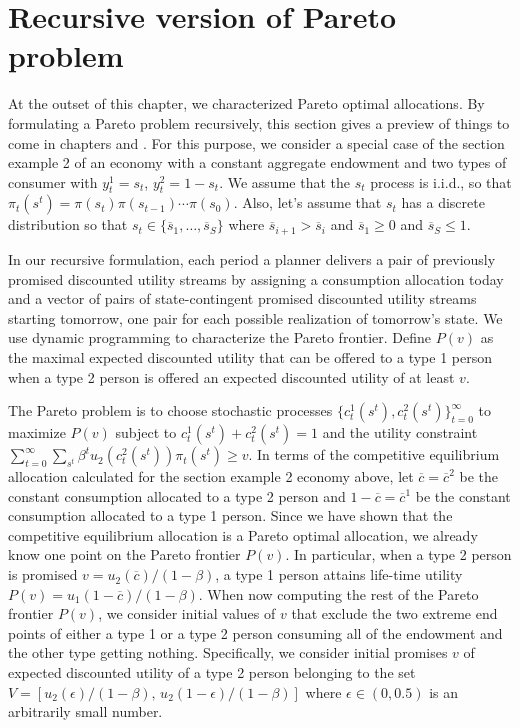 \section{Recursive version of Pareto problem}\label{sec:RecursivePareto}%
At the  outset of this chapter, we characterized Pareto
optimal allocations. By formulating a Pareto problem  recursively, this section
gives a preview of things to come in chapters 
and .
For this purpose, we
consider a special case of the section  example 2 of an
economy with a constant aggregate
endowment and two types of consumer with $y_t^1 = s_t$, $y_t^2 = 1-s_t$.
We  assume that the $s_t$ process
is i.i.d., so that $\pi_t(s^t) = \pi(s_t)
\pi(s_{t-1}) \cdots \pi(s_0)$.   Also, let's assume
that $s_t$ has a discrete distribution
so that
$s_t \in \{\overline s_1, \ldots, \overline s_S\} $
where $\overline s_{i+1} > \overline s_i$ and $\overline s_1 \geq 0$
and $\overline s_S \leq 1$.


In our recursive formulation, each period a planner
delivers a pair of previously promised discounted
utility streams by assigning a consumption
allocation today and a vector of pairs of state-contingent
promised discounted utility streams starting tomorrow,
one pair for each possible realization of tomorrow's state.
We use dynamic programming to characterize the Pareto
frontier. Define $P(v)$ as the maximal expected discounted
utility that can be offered to a type 1 person when 
a type 2 person is offered an expected discounted
utility of at least $v$. 

The Pareto problem is to choose stochastic processes $\{c_t^1(s^t), c_t^2(s^t)\}_{t=0}^\infty$ to
 maximize
$P(v)$ subject to  $c_t^1(s^t) + c_t^2(s^t) =1$ and the utility constraint
$\sum_{t=0}^\infty \sum_{s^t} \beta^t u_2(c_t^2(s^t)) \pi_t(s^t) \geq v.$
In terms of the competitive equilibrium
allocation calculated for  the section  example 2  economy above,
let $\overline c= \overline c^2$ be the  constant consumption
allocated to a type 2 person and $1-\overline
c=\overline c^1$ be the constant consumption
allocated to a type 1 person.
Since we have shown that the competitive equilibrium allocation is
a Pareto optimal allocation, we already know one point on the
Pareto frontier $P(v)$. In particular, when a type 2 person is promised
$v= u_2(\overline c) / (1 - \beta) $, a type 1 person attains
life-time utility
$P(v) =  u_1(1-\overline c) / (1-\beta)$. 
When now computing the rest of the Pareto frontier $P(v)$, 
we consider initial values of $v$ that exclude the two
extreme end points of either a type 1 or a type 2 person 
consuming all of the endowment and the other type getting
nothing. Specifically, we consider initial promises $v$ 
of expected discounted utility of a type 2 person 
belonging to the set
$V = [u_2(\epsilon) / (1-\beta),\,  
      u_2(1-\epsilon) / (1 -\beta)]$ 
where $\epsilon\in(0,0.5)$ is an arbitrarily small number.





